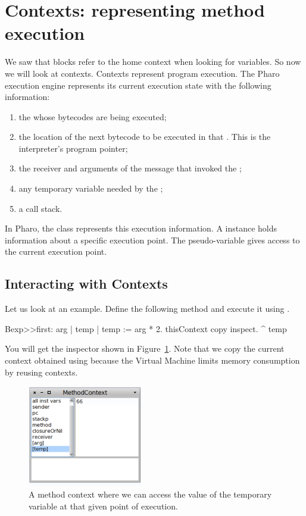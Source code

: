 \documentclass[a4paper,10pt,twoside]{book}
\begin{document}
\section{Contexts: representing method execution}
We saw that blocks refer to the home context when looking for variables. So now we will look at contexts. Contexts represent program execution. The Pharo execution engine represents its current execution state with the following information:

\begin{enumerate}
\item the  whose bytecodes are being executed;
\item the location of the next bytecode to be executed in that . This is the interpreter's program pointer;
\item the receiver and arguments of the message that invoked the ;
\item any temporary variable needed by the ;
\item a call stack.
\end{enumerate}

In Pharo, the class  represents this execution information. A  instance holds information about a specific execution point.  The pseudo-variable  gives access to the current execution point.

\subsection{Interacting with Contexts}

Let us look at an example. Define the following method and execute it using .

\begin{code}{}
Bexp>>first: arg
	| temp |
	temp := arg * 2.
	thisContext copy inspect.
	^ temp
\end{code}

You will get the inspector shown in Figure~\ref{oneContext}. Note that we copy the current context obtained using  because the Virtual Machine limits memory consumption by reusing contexts.

\begin{figure}
\begin{center}\includegraphics[width=5cm]{OneContext}
\caption{A method context where we can access the value of the temporary variable  at that given point of execution.\label{oneContext}}
\end{center}
\end{figure}
\end{document}

